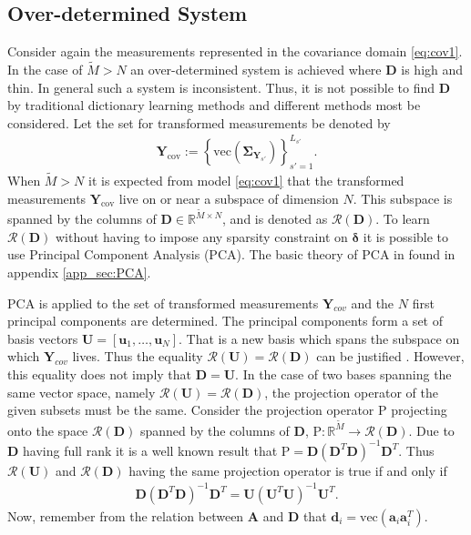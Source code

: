 \subsection{Over-determined System}\label{sec:over_det}
Consider again the measurements represented in the covariance domain \eqref{eq:cov1}.
In the case of $\widetilde{M} > N$ an over-determined system is achieved where $\mathbf{D}$ is high and thin. 
In general such a system is inconsistent. 
Thus, it is not possible to find $\mathbf{D}$ by traditional dictionary learning methods and different methods most be considered.
Let the set for transformed measurements be denoted by 
\begin{align*}
\mathbf{Y}_{\text{cov}} := \left\{\text{vec}\left( \widehat{\boldsymbol{\Sigma}}_{\mathbf{Y}_{s'}} \right) \right\}_{s' = 1}^{L_{s'}}.
\end{align*}
When $\widetilde{M} > N $ it is expected from model \eqref{eq:cov1} that the transformed measurements $\mathbf{Y}_{\text{cov}}$ live on or near a subspace of dimension $N$. 
This subspace is spanned by the columns of $\mathbf{D} \in \mathbb{R}^{\widetilde{M} \times N}$, and is denoted as $\mathcal{R}(\mathbf{D})$. 
To learn $\mathcal{R}(\mathbf{D})$ without having to impose any sparsity constraint on $\boldsymbol{\delta}$ it is possible to use Principal Component Analysis (PCA). The basic theory of PCA in found in appendix \ref{app_sec:PCA}. 

PCA is applied to the set of transformed measurements $\mathbf{Y}_{cov}$ and the $N$ first principal components are determined. 
The principal components form a set of basis vectors $\mathbf{U} = [\mathbf{u}_1, \dots, \mathbf{u}_N]$. 
That is a new basis which spans the subspace on which $\mathbf{Y}_{cov}$ lives. 
Thus the equality $\mathcal{R}(\mathbf{U}) = \mathcal{R}(\mathbf{D})$ can be justified \cite{Balkan2015}.  
However, this equality does not imply that $\mathbf{D} = \mathbf{U}$. 
In the case of two bases spanning the same vector space, namely $\mathcal{R}(\mathbf{U}) = \mathcal{R}(\mathbf{D})$, the projection operator of the given subsets must be the same. 
Consider the projection operator $\text{P}$ projecting onto the space $\mathcal{R}(\mathbf{D})$ spanned by the columns of $\mathbf{D}$, $\text{P}:\mathbb{R}^{\widetilde{M}}\rightarrow \mathcal{R}(\mathbf{D})$. 
Due to $\mathbf{D}$ having full rank it is a well known result that $\text{P} = \mathbf{D}(\mathbf{D}^T \mathbf{D})^{-1} \mathbf{D}^T$. 
Thus $\mathcal{R}(\mathbf{U})$ and $\mathcal{R}(\mathbf{D})$ having the same projection operator is true if and only if 
\begin{align*}
\mathbf{D} (\mathbf{D}^T\mathbf{D})^{-1} \mathbf{D}^T = \mathbf{U}(\mathbf{U}^T \mathbf{U})^{-1} \mathbf{U}^T.
\end{align*}
Now, remember from the relation between $\mathbf{A}$ and $\mathbf{D}$ that $\mathbf{d}_i = \text{vec}(\mathbf{a}_i \mathbf{a}_i^T)$. 

